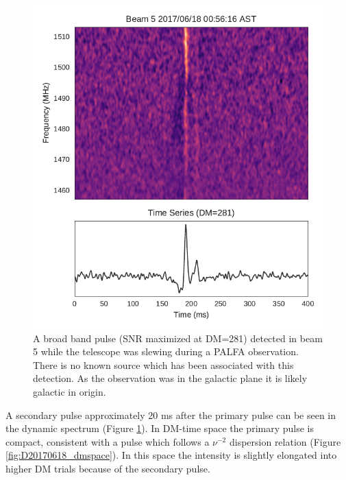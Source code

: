 \documentclass[a4paper,fleqn,usenatbib]{mnras}
\begin{document}
\begin{figure}
    \includegraphics[width=1.0\linewidth]{figures/Beam5_fb_D20170618T005616_buffer2_spectrum.pdf}
    \caption{A broad band pulse (SNR maximized at DM=281) detected in beam 5
    while the telescope was slewing during a PALFA observation. There is no
    known source which has been associated with this detection. As the
    observation was in the galactic plane it is likely galactic in origin.
    }
    \label{fig:D20170618_spectrum}
\end{figure}

A secondary pulse approximately 20 ms after the primary pulse can be seen in the
dynamic spectrum (Figure \ref{fig:D20170618_spectrum}). In DM-time space the
primary pulse is compact, consistent with a pulse which follows a $\nu^{-2}$
dispersion relation (Figure \ref{fig:D20170618_dmspace}). In this space the
intensity is slightly elongated into higher DM trials because of the secondary
pulse.
\end{document}
